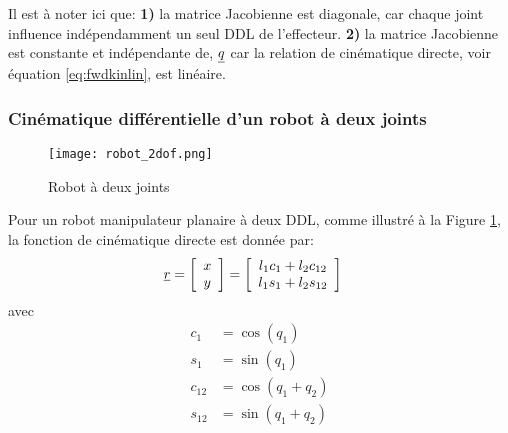 Il est à noter ici que: \textbf{1)} la matrice Jacobienne est diagonale, car chaque joint influence indépendamment un seul DDL de l'effecteur. \textbf{2)} la matrice Jacobienne est constante et indépendante de, $\underline{q}$ car la relation de cinématique directe, voir équation \eqref{eq:fwdkinlin}, est linéaire.


\subsubsection{Cinématique différentielle d'un robot à deux joints}
\label{sec:kindiff_2dof}

\begin{figure}[H]
	\centering
	\texttt{[image: robot\_2dof.png]}
	\caption{Robot à deux joints}
	\label{fig:robot_2dof}
\end{figure}

Pour un robot manipulateur planaire à deux DDL, comme illustré à la Figure \ref{fig:robot_2dof}, la fonction de cinématique directe est donnée par:
\begin{align}
	\underline{r} &= \left[ \begin{array}{c} x \\ y  \end{array} \right]  = \left[ \begin{array}{c}
																				 l_1 c_1 + l_2 c_{12} \\
																				 l_1 s_1 + l_2 s_{12}
	\end{array} \right]
	\label{eq:kinfwd2dof}
\end{align}
avec
\begin{align}
	c_1    &= \cos( q_1 ) \\
	s_1    &= \sin( q_1 ) \\
	c_{12} &= \cos( q_1 + q_2 ) \\
	s_{12} &= \sin( q_1 + q_2 )
\end{align}

